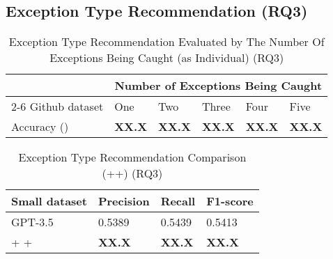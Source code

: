 \subsection{Exception Type Recommendation (RQ3)}
\label{sec:rq3}

\begin{table}[t]%
  \caption{Exception Type Recommendation Evaluated by The Number Of Exceptions Being Caught (\xtype as Individual) (RQ3)}
  \vspace{-12pt}
  \small
	\begin{center}
		\renewcommand{\arraystretch}{1}
		\begin{tabular}{| p{2.3cm}<{\centering} | p{0.8cm}<{\centering} | p{0.8cm}<{\centering}| p{0.8cm}<{\centering} | p{0.8cm}<{\centering} | p{0.8cm}<{\centering} |}
		  \hline
			\multirow{2}{*}{} & \multicolumn{5}{c|}{Number of Exceptions Being Caught} \\
			\cline{2-6}
			 Github dataset & One & Two & Three & Four & Five\\
			\hline
			Accuracy (\xtype) &  \textbf{XX.X} & \textbf{XX.X} & \textbf{XX.X} & \textbf{XX.X} & \textbf{XX.X}\\
			\hline
		\end{tabular}
		\label{tab:r3-xtype-1}
	\end{center}
\end{table}

\begin{table}[t]%
  \caption{Exception Type Recommendation Comparison (\xblock+\xstate+\xtype) (RQ3)}
  \vspace{-12pt}
  \small
	\begin{center}
		\renewcommand{\arraystretch}{1}
		\begin{tabular}{| p{3.10cm}<{\centering} | p{1.2cm}<{\centering} | p{1.2cm}<{\centering}| p{1.2cm}<{\centering}|}
		  \hline
			Small dataset  & Precision  & Recall & F1-score \\
			\hline
                        GPT-3.5 & 0.5389 & 0.5439 & 0.5413 \\
			\hline
			\xblock + \xstate  + \xtype  & \textbf{XX.X}  &  \textbf{XX.X} & \textbf{XX.X}\\
			\hline
		\end{tabular}
		\label{tab:xtype-2}
	\end{center}

\end{table}

